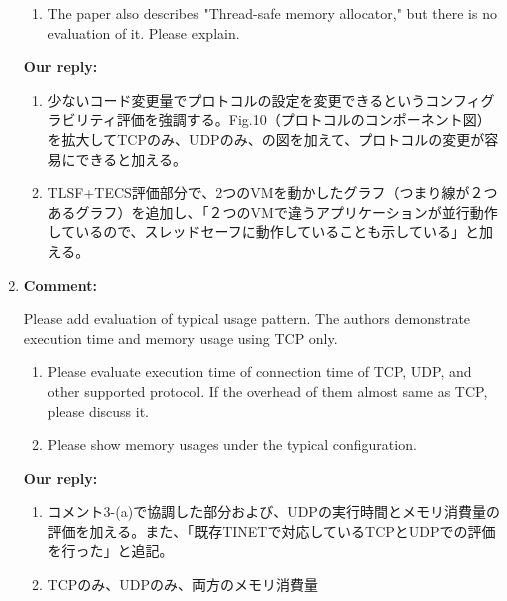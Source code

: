 \documentclass{article}
\begin{document}
\begin{enumerate}
\begin{flushleft}
\begin{enumerate}
\item The paper also describes "Thread-safe memory allocator," but there is no evaluation of it. Please explain.
\end{enumerate}
\end{flushleft}

\begin{flushleft}
\textbf{Our reply:}

\begin{enumerate}
\item 少ないコード変更量でプロトコルの設定を変更できるというコンフィグラビリティ評価を強調する。Fig.10（プロトコルのコンポーネント図）を拡大してTCPのみ、UDPのみ、の図を加えて、プロトコルの変更が容易にできると加える。
\item TLSF+TECS評価部分で、2つのVMを動かしたグラフ（つまり線が２つあるグラフ）を追加し、「２つのVMで違うアプリケーションが並行動作しているので、スレッドセーフに動作していることも示している」と加える。
\end{enumerate}
\end{flushleft}

\item \begin{flushleft}
\textbf{Comment:}

Please add evaluation of typical usage pattern. The authors demonstrate execution time and memory usage using TCP only. 

\begin{enumerate}
\item Please evaluate execution time of connection time of TCP, UDP, and other supported protocol. If the overhead of them almost same as TCP, please discuss it. 

\item Please show memory usages under the typical configuration.
\end{enumerate}
\end{flushleft}

\begin{flushleft}
\textbf{Our reply:}

\begin{enumerate}
\item コメント3-(a)で協調した部分および、UDPの実行時間とメモリ消費量の評価を加える。また、「既存TINETで対応しているTCPとUDPでの評価を行った」と追記。

\item TCPのみ、UDPのみ、両方のメモリ消費量
\end{enumerate}
\end{flushleft}


\end{enumerate}
\end{document}
